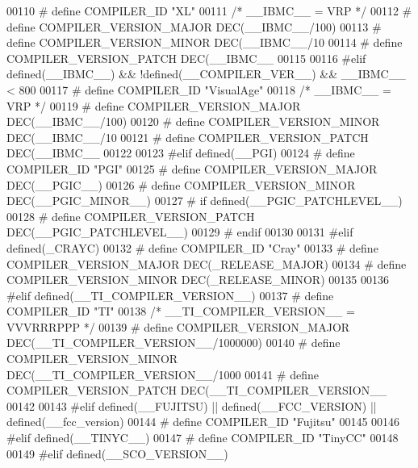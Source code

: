 \begin{DoxyCode}
{{{{{{{{{{{{{{{00110 \textcolor{preprocessor}{# define COMPILER\_ID "XL"}
00111   \textcolor{comment}{/* \_\_IBMC\_\_ = VRP */}
00112 \textcolor{preprocessor}{# define COMPILER\_VERSION\_MAJOR DEC(\_\_IBMC\_\_/100)}
00113 \textcolor{preprocessor}{# define COMPILER\_VERSION\_MINOR DEC(\_\_IBMC\_\_/10 %
00114 \textcolor{preprocessor}{# define COMPILER\_VERSION\_PATCH DEC(\_\_IBMC\_\_    %
00115 
00116 \textcolor{preprocessor}{#elif defined(\_\_IBMC\_\_) && !defined(\_\_COMPILER\_VER\_\_) && \_\_IBMC\_\_ < 800}
00117 \textcolor{preprocessor}{# define COMPILER\_ID "VisualAge"}
00118   \textcolor{comment}{/* \_\_IBMC\_\_ = VRP */}
00119 \textcolor{preprocessor}{# define COMPILER\_VERSION\_MAJOR DEC(\_\_IBMC\_\_/100)}
00120 \textcolor{preprocessor}{# define COMPILER\_VERSION\_MINOR DEC(\_\_IBMC\_\_/10 %
00121 \textcolor{preprocessor}{# define COMPILER\_VERSION\_PATCH DEC(\_\_IBMC\_\_    %
00122 
00123 \textcolor{preprocessor}{#elif defined(\_\_PGI)}
00124 \textcolor{preprocessor}{# define COMPILER\_ID "PGI"}
00125 \textcolor{preprocessor}{# define COMPILER\_VERSION\_MAJOR DEC(\_\_PGIC\_\_)}
00126 \textcolor{preprocessor}{# define COMPILER\_VERSION\_MINOR DEC(\_\_PGIC\_MINOR\_\_)}
00127 \textcolor{preprocessor}{# if defined(\_\_PGIC\_PATCHLEVEL\_\_)}
00128 \textcolor{preprocessor}{#  define COMPILER\_VERSION\_PATCH DEC(\_\_PGIC\_PATCHLEVEL\_\_)}
00129 \textcolor{preprocessor}{# endif}
00130 
00131 \textcolor{preprocessor}{#elif defined(\_CRAYC)}
00132 \textcolor{preprocessor}{# define COMPILER\_ID "Cray"}
00133 \textcolor{preprocessor}{# define COMPILER\_VERSION\_MAJOR DEC(\_RELEASE\_MAJOR)}
00134 \textcolor{preprocessor}{# define COMPILER\_VERSION\_MINOR DEC(\_RELEASE\_MINOR)}
00135 
00136 \textcolor{preprocessor}{#elif defined(\_\_TI\_COMPILER\_VERSION\_\_)}
00137 \textcolor{preprocessor}{# define COMPILER\_ID "TI"}
00138   \textcolor{comment}{/* \_\_TI\_COMPILER\_VERSION\_\_ = VVVRRRPPP */}
00139 \textcolor{preprocessor}{# define COMPILER\_VERSION\_MAJOR DEC(\_\_TI\_COMPILER\_VERSION\_\_/1000000)}
00140 \textcolor{preprocessor}{# define COMPILER\_VERSION\_MINOR DEC(\_\_TI\_COMPILER\_VERSION\_\_/1000   %
00141 \textcolor{preprocessor}{# define COMPILER\_VERSION\_PATCH DEC(\_\_TI\_COMPILER\_VERSION\_\_        %
00142 
00143 \textcolor{preprocessor}{#elif defined(\_\_FUJITSU) || defined(\_\_FCC\_VERSION) || defined(\_\_fcc\_version)}
00144 \textcolor{preprocessor}{# define COMPILER\_ID "Fujitsu"}
00145 
00146 \textcolor{preprocessor}{#elif defined(\_\_TINYC\_\_)}
00147 \textcolor{preprocessor}{# define COMPILER\_ID "TinyCC"}
00148 
00149 \textcolor{preprocessor}{#elif defined(\_\_SCO\_VERSION\_\_)}
}}}}}}}}}}}}}}}}}}}}}
\end{DoxyCode}
